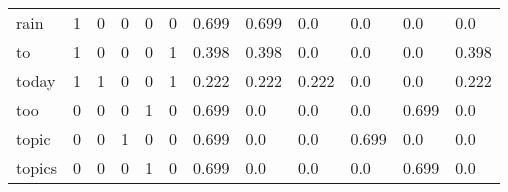 \begin{tabular}{llllllrlllll}
rain        &     1 &     0 &     0 &     0 &     0 &  0.699 &     0.699 &       0.0 &       0.0 &       0.0 &       0.0 \\
to          &     1 &     0 &     0 &     0 &     1 &  0.398 &     0.398 &       0.0 &       0.0 &       0.0 &     0.398 \\
today       &     1 &     1 &     0 &     0 &     1 &  0.222 &     0.222 &     0.222 &       0.0 &       0.0 &     0.222 \\
too         &     0 &     0 &     0 &     1 &     0 &  0.699 &       0.0 &       0.0 &       0.0 &     0.699 &       0.0 \\
topic       &     0 &     0 &     1 &     0 &     0 &  0.699 &       0.0 &       0.0 &     0.699 &       0.0 &       0.0 \\
topics      &     0 &     0 &     0 &     1 &     0 &  0.699 &       0.0 &       0.0 &       0.0 &     0.699 &       0.0 \\
\bottomrule
\end{tabular}
